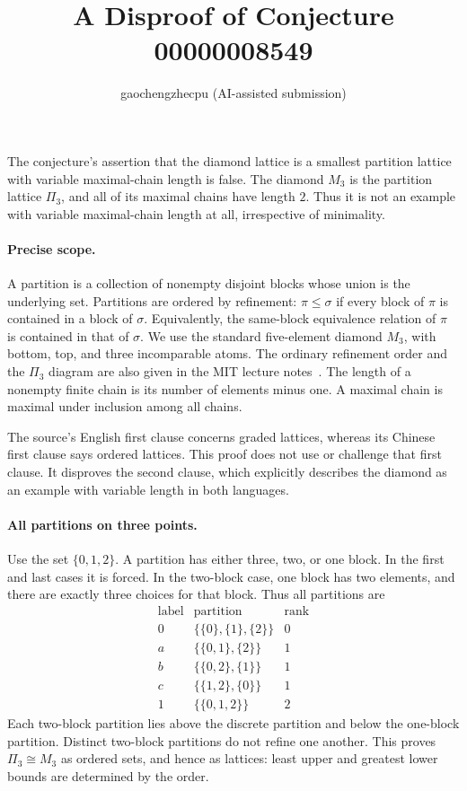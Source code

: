 \documentclass[11pt]{article}
\title{A Disproof of Conjecture 00000008549}
\author{gaochengzhecpu (AI-assisted submission)}
\date{}
\begin{document}
\maketitle

The conjecture's assertion that the diamond lattice is a smallest
partition lattice with variable maximal-chain length is false.
The diamond $M_3$ is the partition lattice $\Pi_3$, and all of its
maximal chains have length $2$.  Thus it is not an example with
variable maximal-chain length at all, irrespective of minimality.

\paragraph{Precise scope.}
A partition is a collection of nonempty disjoint blocks whose union
is the underlying set.  Partitions are ordered by refinement:
$\pi\leq\sigma$ if every block of $\pi$ is contained in a block of
$\sigma$.  Equivalently, the same-block equivalence relation of $\pi$
is contained in that of $\sigma$.  We use the standard five-element
diamond $M_3$, with bottom, top, and three incomparable atoms.
The ordinary refinement order and the $\Pi_3$ diagram are also given
in the MIT lecture notes~\cite{postnikov}.
The length of a nonempty finite chain is its number of elements minus
one.  A maximal chain is maximal under inclusion among all chains.

The source's English first clause concerns graded lattices, whereas
its Chinese first clause says ordered lattices.  This proof does not
use or challenge that first clause.  It disproves the second clause,
which explicitly describes the diamond as an example with variable
length in both languages.

\paragraph{All partitions on three points.}
Use the set $\{0,1,2\}$.  A partition has either three, two, or one
block.  In the first and last cases it is forced.  In the two-block
case, one block has two elements, and there are exactly three choices
for that block.  Thus all partitions are
\[
\begin{array}{c|c|c}
\text{label}&\text{partition}&\text{rank}\\\hline
0&\{\{0\},\{1\},\{2\}\}&0\\
a&\{\{0,1\},\{2\}\}&1\\
b&\{\{0,2\},\{1\}\}&1\\
c&\{\{1,2\},\{0\}\}&1\\
1&\{\{0,1,2\}\}&2
\end{array}
\]
Each two-block partition lies above the discrete partition and below
the one-block partition.  Distinct two-block partitions do not refine
one another.  This proves $\Pi_3\cong M_3$ as ordered sets, and hence
as lattices: least upper and greatest lower bounds are determined by
the order.
\end{document}
